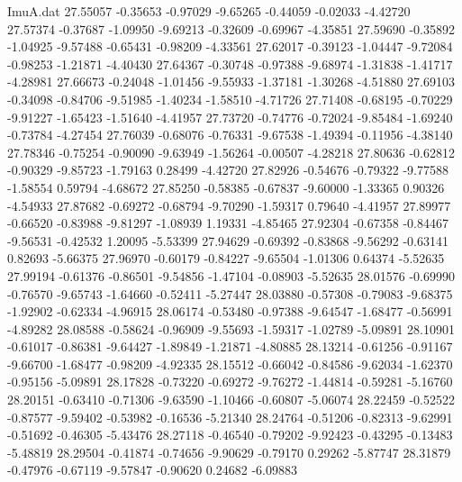 \begin{filecontents}{ImuA.dat}
  27.55057   -0.35653   -0.97029   -9.65265   -0.44059   -0.02033   -4.42720
  27.57374   -0.37687   -1.09950   -9.69213   -0.32609   -0.69967   -4.35851
  27.59690   -0.35892   -1.04925   -9.57488   -0.65431   -0.98209   -4.33561
  27.62017   -0.39123   -1.04447   -9.72084   -0.98253   -1.21871   -4.40430
  27.64367   -0.30748   -0.97388   -9.68974   -1.31838   -1.41717   -4.28981
  27.66673   -0.24048   -1.01456   -9.55933   -1.37181   -1.30268   -4.51880
  27.69103   -0.34098   -0.84706   -9.51985   -1.40234   -1.58510   -4.71726
  27.71408   -0.68195   -0.70229   -9.91227   -1.65423   -1.51640   -4.41957
  27.73720   -0.74776   -0.72024   -9.85484   -1.69240   -0.73784   -4.27454
  27.76039   -0.68076   -0.76331   -9.67538   -1.49394   -0.11956   -4.38140
  27.78346   -0.75254   -0.90090   -9.63949   -1.56264   -0.00507   -4.28218
  27.80636   -0.62812   -0.90329   -9.85723   -1.79163    0.28499   -4.42720
  27.82926   -0.54676   -0.79322   -9.77588   -1.58554    0.59794   -4.68672
  27.85250   -0.58385   -0.67837   -9.60000   -1.33365    0.90326   -4.54933
  27.87682   -0.69272   -0.68794   -9.70290   -1.59317    0.79640   -4.41957
  27.89977   -0.66520   -0.83988   -9.81297   -1.08939    1.19331   -4.85465
  27.92304   -0.67358   -0.84467   -9.56531   -0.42532    1.20095   -5.53399
  27.94629   -0.69392   -0.83868   -9.56292   -0.63141    0.82693   -5.66375
  27.96970   -0.60179   -0.84227   -9.65504   -1.01306    0.64374   -5.52635
  27.99194   -0.61376   -0.86501   -9.54856   -1.47104   -0.08903   -5.52635
  28.01576   -0.69990   -0.76570   -9.65743   -1.64660   -0.52411   -5.27447
  28.03880   -0.57308   -0.79083   -9.68375   -1.92902   -0.62334   -4.96915
  28.06174   -0.53480   -0.97388   -9.64547   -1.68477   -0.56991   -4.89282
  28.08588   -0.58624   -0.96909   -9.55693   -1.59317   -1.02789   -5.09891
  28.10901   -0.61017   -0.86381   -9.64427   -1.89849   -1.21871   -4.80885
  28.13214   -0.61256   -0.91167   -9.66700   -1.68477   -0.98209   -4.92335
  28.15512   -0.66042   -0.84586   -9.62034   -1.62370   -0.95156   -5.09891
  28.17828   -0.73220   -0.69272   -9.76272   -1.44814   -0.59281   -5.16760
  28.20151   -0.63410   -0.71306   -9.63590   -1.10466   -0.60807   -5.06074
  28.22459   -0.52522   -0.87577   -9.59402   -0.53982   -0.16536   -5.21340
  28.24764   -0.51206   -0.82313   -9.62991   -0.51692   -0.46305   -5.43476
  28.27118   -0.46540   -0.79202   -9.92423   -0.43295   -0.13483   -5.48819
  28.29504   -0.41874   -0.74656   -9.90629   -0.79170    0.29262   -5.87747
  28.31879   -0.47976   -0.67119   -9.57847   -0.90620    0.24682   -6.09883

\end{filecontents}
